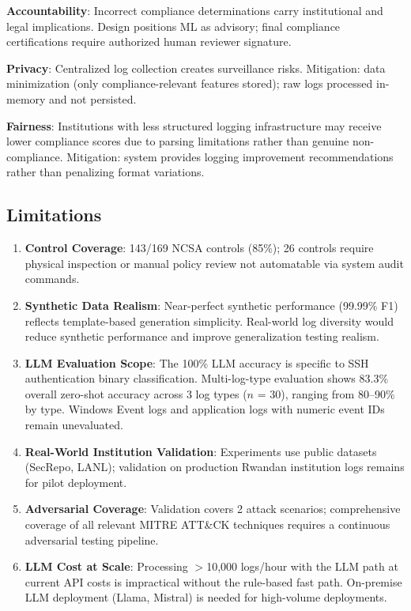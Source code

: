 \documentclass[futureinternet,article,submit,pdftex,moreauthors]{Definitions/mdpi}
\begin{document}
\textbf{Accountability}: Incorrect compliance determinations carry institutional and legal
implications. Design positions ML as advisory; final compliance certifications require
authorized human reviewer signature.

\textbf{Privacy}: Centralized log collection creates surveillance risks. Mitigation:
data minimization (only compliance-relevant features stored); raw logs processed in-memory
and not persisted.

\textbf{Fairness}: Institutions with less structured logging infrastructure may receive lower
compliance scores due to parsing limitations rather than genuine non-compliance. Mitigation:
system provides logging improvement recommendations rather than penalizing format variations.

\subsection{Limitations}

\begin{enumerate}
\item \textbf{Control Coverage}: 143/169 NCSA controls (85\%); 26 controls require physical
inspection or manual policy review not automatable via system audit commands.
\item \textbf{Synthetic Data Realism}: Near-perfect synthetic performance (99.99\% F1)
reflects template-based generation simplicity. Real-world log diversity would reduce synthetic
performance and improve generalization testing realism.
\item \textbf{LLM Evaluation Scope}: The 100\% LLM accuracy is specific to SSH authentication
binary classification. Multi-log-type evaluation shows 83.3\% overall zero-shot accuracy
across 3 log types ($n$ = 30), ranging from 80--90\% by type. Windows Event logs and
application logs with numeric event IDs remain unevaluated.
\item \textbf{Real-World Institution Validation}: Experiments use public datasets
(SecRepo, LANL); validation on production Rwandan institution logs remains for pilot
deployment.
\item \textbf{Adversarial Coverage}: Validation covers 2 attack scenarios; comprehensive
coverage of all relevant MITRE ATT\&CK techniques requires a continuous adversarial testing
pipeline.
\item \textbf{LLM Cost at Scale}: Processing ${>}$10{,}000 logs/hour with the LLM path at
current API costs is impractical without the rule-based fast path. On-premise LLM deployment
(Llama, Mistral) is needed for high-volume deployments.
\end{enumerate}
\end{document}
